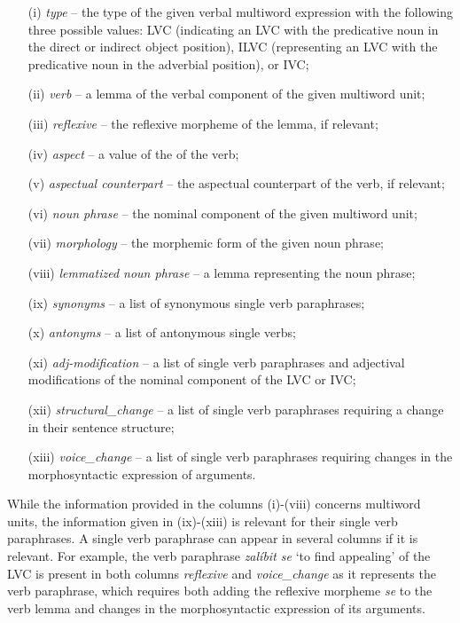 \documentclass[output=paper
,modfonts
,nonflat]{langsci/langscibook}
\begin{document}
\begin{itemize}
    \item[(i)] \emph{type} -- the type of the given verbal multiword expression 
     with the following three possible values: LVC (indicating an LVC with the 
     predicative noun in the direct or indirect object position), ILVC (representing an LVC 
     with the predicative noun in the adverbial position), or IVC;
   \item[(ii)] \emph{verb} -- a lemma of the verbal component of the given multiword unit;
   \item[(iii)] \emph{reflexive} -- the reflexive morpheme of the lemma, if relevant;
   \item[(iv)] \emph{aspect} -- a value of the  of the verb;
   \item[(v)]  \emph{aspectual counterpart} -- the aspectual counterpart of the verb, if relevant;
   \item[(vi)] \emph{noun phrase} -- the nominal component of the given multiword unit;
   \item[(vii)] \emph{morphology} -- the morphemic form of the given noun phrase;
   \item[(viii)] \emph{lemmatized noun phrase} -- a lemma representing the noun phrase;
   \item[(ix)] \emph{synonyms} -- a list of synonymous single verb paraphrases;
   \item[(x)] \emph{antonyms}  -- a list of antonymous single verbs;
   \item[(xi)] \emph{adj-modification} --  a list of single verb paraphrases 
   and adjectival modifications of the nominal component of the LVC or IVC;
   \item[(xii)] \emph{structural\_change} --  a list of single verb paraphrases requiring a change in their sentence structure;
   \item[(xiii)] \emph{voice\_change} --   a list of single verb paraphrases requiring changes in the morphosyntactic expression of arguments.
\end{itemize}
	
While the information provided in the columns (i)-(viii) concerns multiword units, 
the information given in (ix)-(xiii) is relevant for their single verb paraphrases.
A single verb paraphrase can appear in several columns if it is relevant. For example, 
the verb paraphrase \textit{zalíbit se} `to find appealing' of the LVC  is present in both columns 
\emph{reflexive} and \emph{voice\_change} as it represents the verb paraphrase,  
which requires both adding the reflexive morpheme \textit{se} to the verb lemma and 
changes in the morphosyntactic expression of its arguments.
\end{document}
